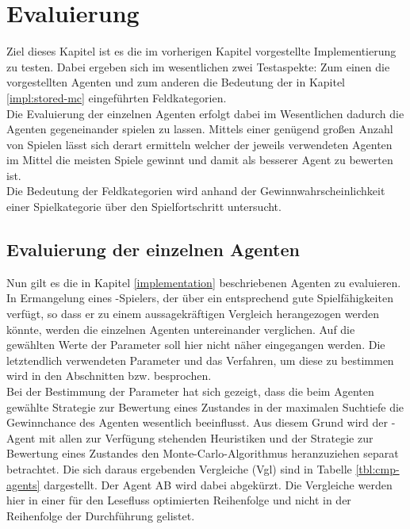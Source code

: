 \chapter{Evaluierung}
Ziel dieses Kapitel ist es die im vorherigen Kapitel vorgestellte Implementierung zu testen. Dabei ergeben sich im wesentlichen zwei Testaspekte: Zum einen die vorgestellten Agenten und zum anderen die Bedeutung der in Kapitel \ref{impl:stored-mc} eingeführten Feldkategorien.
\vspace{0.5cm}
\\Die Evaluierung der einzelnen Agenten erfolgt dabei im Wesentlichen dadurch die Agenten gegeneinander spielen zu lassen. Mittels einer genügend großen Anzahl von Spielen lässt sich derart ermitteln welcher der jeweils verwendeten Agenten im Mittel die meisten Spiele gewinnt und damit als besserer Agent zu bewerten ist.
\\Die Bedeutung der Feldkategorien wird anhand der Gewinnwahrscheinlichkeit einer Spielkategorie über den Spielfortschritt untersucht.
\section{Evaluierung der einzelnen Agenten}
\label{cpt:eval-agents}
Nun gilt es die in Kapitel \ref{implementation} beschriebenen Agenten zu evaluieren. In Ermangelung eines \ot-Spielers, der über ein entsprechend gute Spielfähigkeiten verfügt, so dass er zu einem aussagekräftigen Vergleich herangezogen werden könnte, werden die einzelnen Agenten untereinander verglichen. Auf die gewählten Werte der Parameter soll hier nicht näher eingegangen werden. Die letztendlich verwendeten Parameter und das Verfahren, um diese zu bestimmen wird in den Abschnitten  bzw.  besprochen.
\\Bei der Bestimmung der Parameter hat sich gezeigt, dass die beim Agenten \mxZitat{\abp} gewählte Strategie zur Bewertung eines Zustandes in der maximalen Suchtiefe die Gewinnchance des Agenten wesentlich beeinflusst. Aus diesem Grund wird der \mxZitat{\abp}-Agent mit allen zur Verfügung stehenden Heuristiken und der Strategie zur Bewertung eines Zustandes den Monte-Carlo-Algorithmus heranzuziehen separat betrachtet. Die sich daraus ergebenden Vergleiche (\acs{Vgl}) sind in Tabelle \ref{tbl:cmp-agents} dargestellt. Der Agent \ac{AB} wird dabei abgekürzt. Die Vergleiche werden hier in einer für den Lesefluss optimierten Reihenfolge und nicht in der Reihenfolge der Durchführung gelistet.


